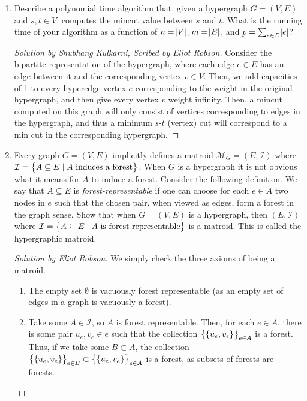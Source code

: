 \documentclass{article}
\newenvironment{solution}[1]{\begin{proof}[Solution by #1]}{\end{proof}}
\newenvironment{scribed}[2]{\begin{proof}[Solution by #1, Scribed by #2]}{\end{proof}}
\begin{document}
\begin{enumerate}
	\item Describe a polynomial time algorithm that, given a hypergraph \(G = (V,E)\) and \(s,t \in V\), computes the mincut value between \(s\) and \(t\). What is the running time of your algorithm as a function of \(n = \abs{V}, m = \abs{E}\), and \(p = \sum_{e \in E} \abs{e}\)?

	\begin{scribed}{Shubhang Kulkarni}{Eliot Robson}
		Consider the bipartite representation of the hypergraph, where each edge \(e \in E\) has an edge between it and the corresponding vertex \(v \in V\). Then, we add capacities of 1 to every hyperedge vertex \(e\) corresponding to the weight in the original hypergraph, and then give every vertex \(v\) weight infinity. Then, a mincut computed on this graph will only consist of vertices corresponding to edges in the hypergraph, and thus a minimum \(s\)-\(t\) (vertex) cut will correspond to a min cut in the corresponding hypergraph.
	\end{scribed}

	\item Every graph \(G = (V,E)\) implicitly defines a matroid \(\mathcal{M}_G = (E, \mathcal{I})\) where \(\mathcal{I} = \set{A \subseteq E \mid A \text{ induces a forest}}\). When \(G\) is a hypergraph it is not obvious what it means for \(A\) to induce a forest. Consider the following definition. We say that \(A \subseteq E\) is \emph{forest-representable} if one can choose for each \(e \in A\) two nodes in \(e\) such that the chosen pair, when viewed as edges, form a forest in the graph sense. Show that when \(G = (V,E)\) is a hypergraph, then \((E, \mathcal{I})\) where \(\mathcal{I} = \set{A \subseteq E \mid A \text{ is forest representable}}\) is a matroid. This is called the hypergraphic matroid.
	
	\begin{solution}{Eliot Robson}
		We simply check the three axioms of being a matroid.
		
		\begin{enumerate}
			\item The empty set \(\emptyset\) is vacuously forest representable (as an empty set of edges in a graph is vacuously a forest).
			
			\item Take some \(A \in \mathcal{I}\), so \(A\) is forest representable. Then, for each \(e \in A\), there is some pair \(u_e,v_e \in e\) such that the collection \(\set{\set{u_e, v_e}}_{e \in A}\) is a forest. Thus, if we take some \(B \subset A\), the collection \(\set{\set{u_e, v_e}}_{e \in B} \subset \set{\set{u_e, v_e}}_{e \in A}\) is a forest, as subsets of forests are forests.
			

\end{enumerate}
\end{solution}
\end{enumerate}
\end{document}
